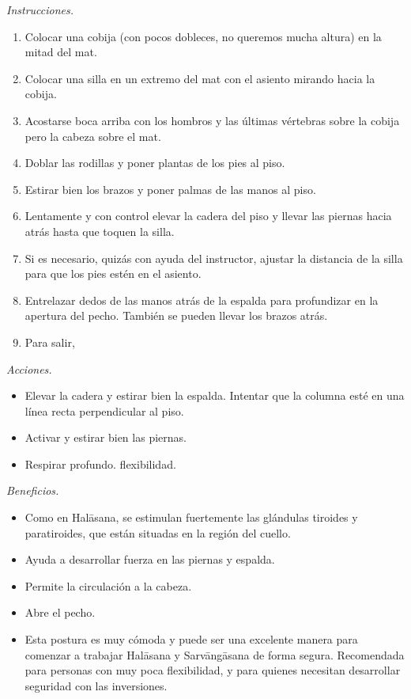 \emph{Instrucciones.}
\begin{enumerate}
\item Colocar una cobija (con pocos dobleces,
no queremos mucha altura) en la mitad del
mat.
\item Colocar una silla en un extremo del mat
con el asiento mirando hacia la cobija.
\item Acostarse boca arriba con los hombros y
las últimas vértebras sobre la cobija pero la
cabeza sobre el mat.
\item Doblar las rodillas y poner plantas de
los pies al piso.
\item Estirar bien los brazos y poner palmas
de las manos al piso.
\item Lentamente y con control elevar la
cadera del piso y llevar las piernas hacia
atrás hasta que toquen la silla.
\item Si es necesario, quizás con ayuda del
instructor, ajustar la distancia de la silla
para que los pies estén en el asiento.
\item Entrelazar dedos de las manos atrás de
la espalda para profundizar en la apertura
del pecho. También se pueden llevar los
brazos atrás.
\item Para salir,
\end{enumerate}

\emph{Acciones.}
\begin{itemize}
\item Elevar la cadera y estirar bien la
espalda. Intentar que la columna esté en una
línea recta perpendicular al piso.
\item Activar y estirar bien las piernas.
\item Respirar profundo. flexibilidad.
\end{itemize}

\emph{Beneficios.}
\begin{itemize}
\item Como en Halāsana, se estimulan
fuertemente las glándulas tiroides y
paratiroides, que están situadas en la región
del cuello.
\item Ayuda a desarrollar fuerza en las
piernas y espalda.
\item Permite la circulación a la cabeza.
\item Abre el pecho.
\item Esta postura es muy cómoda y puede ser
una excelente manera para comenzar a trabajar
Halāsana y Sarvāngāsana de forma segura.
Recomendada para personas con muy poca
flexibilidad, y para quienes necesitan
desarrollar seguridad con las inversiones.
\end{itemize}

